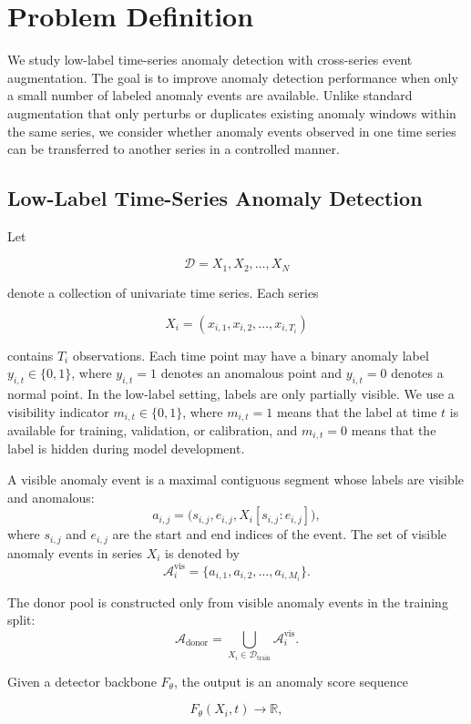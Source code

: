 \documentclass[conference]{IEEEtran}
\begin{document}
\section{Problem Definition}
\label{sec:problem}

We study low-label time-series anomaly detection with cross-series event augmentation. The goal is to improve anomaly detection performance when only a small number of labeled anomaly events are available. Unlike standard augmentation that only perturbs or duplicates existing anomaly windows within the same series, we consider whether anomaly events observed in one time series can be transferred to another series in a controlled manner.

\subsection{Low-Label Time-Series Anomaly Detection}

Let

\[
\mathcal{D}={X_1,X_2,\ldots,X_N}
\]

denote a collection of univariate time series. Each series

\[
X_i=(x_{i,1},x_{i,2},\ldots,x_{i,T_i})
\]

contains $T_i$ observations. Each time point may have a binary anomaly label
$y_{i,t}\in\{0,1\}$, where $y_{i,t}=1$ denotes an anomalous point and
$y_{i,t}=0$ denotes a normal point. In the low-label setting, labels are only
partially visible. We use a visibility indicator
$m_{i,t}\in\{0,1\}$, where $m_{i,t}=1$ means that the label at time $t$ is
available for training, validation, or calibration, and $m_{i,t}=0$ means that
the label is hidden during model development.


A visible anomaly event is a maximal contiguous segment whose labels are visible
and anomalous:
\[
a_{i,j}=\big(s_{i,j},e_{i,j},X_i[s_{i,j}:e_{i,j}]\big),
\]
where $s_{i,j}$ and $e_{i,j}$ are the start and end indices of the event.
The set of visible anomaly events in series $X_i$ is denoted by
\[
\mathcal{A}^{\mathrm{vis}}_i
=
\{a_{i,1},a_{i,2},\ldots,a_{i,M_i}\}.
\]

The donor pool is constructed only from visible anomaly events in the training
split:
\[
\mathcal{A}_{\mathrm{donor}}
=
\bigcup_{X_i\in\mathcal{D}_{\mathrm{train}}}
\mathcal{A}^{\mathrm{vis}}_i .
\]

Given a detector backbone $F_\theta$, the output is an anomaly score sequence

\[
F_\theta(X_i,t)\rightarrow \mathbb{R},
\]
\end{document}
